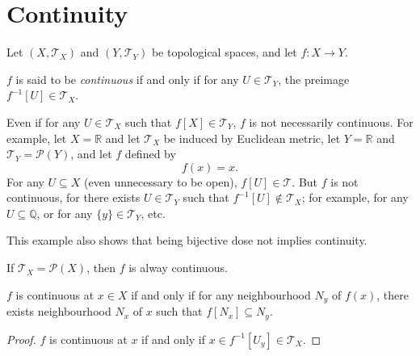 \section{Continuity}

Let $(X, \mathcal T_X)$ and $(Y, \mathcal T_Y)$ be topological spaces, and let $f:X \to Y$.

\begin{definition}
	$f$ is said to be \textit{continuous} if and only if for any $U \in \mathcal T_Y$, the preimage $f^{-1}[U] \in \mathcal T_X$.
\end{definition}


\begin{example}
	Even if for any $U \in \mathcal T_X$ such that $f[X] \in \mathcal T_Y$, $f$ is not necessarily continuous. For example, let $X = \mathbb R$ and let $\mathcal T_X$ be induced by Euclidean metric, let $Y = \mathbb R$ and $\mathcal T_Y = \mathcal P(Y)$, and let $f$ defined by
	$$
	f(x) = x.
	$$
	For any $U \subseteq X$ (even unnecessary to be open), $f[U] \in \mathcal T$. But $f$ is not continuous, for there exists $U \in \mathcal T_Y$ such that $f^{-1}[U] \notin \mathcal T_X$; for example, for any $U \subseteq \mathbb Q$, or for any $\{y\} \in \mathcal T_Y$, etc.
	
	This example also shows that being bijective dose not implies continuity.  
\end{example}


\begin{example}
	If $\mathcal T_X = \mathcal P(X)$, then $f$ is alway continuous.
\end{example}


\begin{proposition}
	$f$ is continuous at $x \in X$ if and only if for any neighbourhood $N_y$ of $f(x)$, there exists neighbourhood $N_x$ of $x$ such that $f[N_x] \subseteq N_y$.
	
	\begin{proof}
		$f$ is continuous at $x$ if and only if $x \in f^{-1}[U_y] \in \mathcal T_X$.
	\end{proof}
\end{proposition}







































%